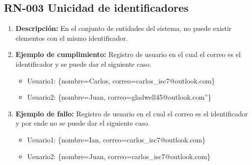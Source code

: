 \subsection{RN-003 Unicidad de identificadores} \label{RN003}
    \begin{enumerate}[label= ]
        \item \textbf{Descripción:} En el conjunto de entidades del sistema, no puede existir elementos con el mismo identificador.
        \item \textbf{Ejemplo de cumplimiento:} Registro de usuario en el cual el correo es el identificador y se puede dar el siguiente caso.
              \begin{itemize}
                  \item Usuario1: \{nombre=Carlos, correo=carlos\_isc7@outlook.com\}
                  \item Usuario2: \{nombre=Juan, correo=gladwell45@outlook.com”\}
              \end{itemize}
        \item \textbf{Ejemplo de fallo:} Registro de usuario en el cual el correo es el identificador y por ende no se puede dar el siguiente caso.
            \begin{itemize}
                \item Usuario1: \{nombre=Ian, correo=carlos\_isc7@outlook.com\}
                \item  Usuario2: \{nombre=Juan, correo=carlos\_isc7@outlook.com\}
            \end{itemize}
    \end{enumerate}

